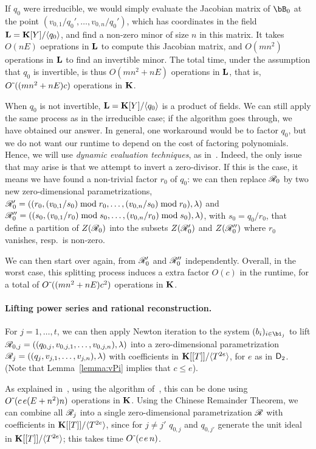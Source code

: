\documentclass[12pt]{article}
\begin{document}
If $q_0$ were irreducible, we would simply evaluate the Jacobian
matrix of $\bB_0$ at the point $(v_{0,1}/q_0',\dots,v_{0,n}/q_0')$,
which has coordinates in the field $\mathbf{L}=\mathbf{K}[Y]/\langle q_0 \rangle$,
and find a non-zero minor of size $n$ in this matrix. It takes $O(n
E)$ oeprations in $\mathbf{L}$ to compute this Jacobian matrix, and $O(mn^2)$
operations in $\mathbf{L}$ to find an invertible minor. The total time, under
the assumption that $q_0$ is invertible, is thus $O(mn^2 + nE)$ operations
in $\mathbf{L}$, that is, ${O}{\,\tilde{ }\,}( (mn^2 + nE) c)$ operations in $\mathbf{K}$.

When $q_0$ is not invertible, $\mathbf{L}=\mathbf{K}[Y]/\langle q_0 \rangle$ is a
product of fields. We can still apply the same process as in the
irreducible case; if the algorithm goes through, we have obtained our
answer. In general, one workaround would be to factor $q_0$, but we do
not want our runtime to depend on the cost of factoring
polynomials. Hence, we will use {\em dynamic evaluation techniques},
as in~\cite{D5}. Indeed, the only issue that may arise is that we
attempt to invert a zero-divisor. If this is the case, it means we
have found a non-trivial factor $r_0$ of $q_0$: we can then replace
$\mathscr{R}_0$ by two new zero-dimensional parametrizations,
$\mathscr{R}'_0=((r_0,(v_{0,1}/s_0) \bmod r_0,\dots,(v_{0,n}/s_0)\bmod
r_0),\lambda)$ and $\mathscr{R}''_0=((s_0,(v_{0,1}/r_0) \bmod
s_0,\dots,(v_{0,n}/ r_0)\bmod s_0),\lambda)$, with $s_0=q_0/r_0$, that
define a partition of $Z(\mathscr{R}_0)$ into the subsets
$Z(\mathscr{R}'_0)$ and $Z(\mathscr{R}''_0)$ where $r_0$
vanishes, resp.\ is non-zero.

We can then start over again, from $\mathscr{R}'_0$ and $\mathscr{R}''_0$
independently. Overall, in the worst case, this splitting process 
induces a extra factor $O(c)$ in the runtime, 
for a total of ${O}{\,\tilde{ }\,}( (mn^2 + nE) c^2)$ operations in $\mathbf{K}$.

\paragraph{Lifting power series and rational reconstruction.}
For $j=1,\dots,t$, we can then apply Newton iteration to the system
$(b_i)_{i \in \bi_j}$ to lift
$\mathscr{R}_{0,j}=((q_{0,j},v_{0,j,1},\dots,v_{0,j,n}),\lambda)$ into a
zero-dimensional parametrization
$\mathscr{R}_{j}=((q_{j},v_{j,1},\dots,v_{j,n}),\lambda)$ with coefficients
in $\mathbf{K}[[T]]/\langle T^{2e}\rangle$, for $e$ as in ${\mathsf{D}}_2$.
(Note that Lemma~\ref{lemma:vPi} implies that $c \le e$).

As explained in~\cite[Section~2.2]{SaSc16}, using the algorithm
of~\cite{GiLeSa01}, this can be done using ${O}{\,\tilde{ }\,}(c\,e (E+n^2)n)$
operations in $\mathbf{K}$.  Using the Chinese Remainder Theorem, we can
combine all $\mathscr{R}_{j}$ into a single zero-dimensional parametrization
$\mathscr{R}$ with coefficients in $\mathbf{K}[[T]]/\langle T^{2e}\rangle$, since
for $j\ne j'$ $q_{0,j}$ and $q_{0,j'}$ generate the unit ideal in
$\mathbf{K}[[T]]/\langle T^{2e}\rangle$; this takes time 
${O}{\,\tilde{ }\,}(c\,e\,n)$.
\end{document}
